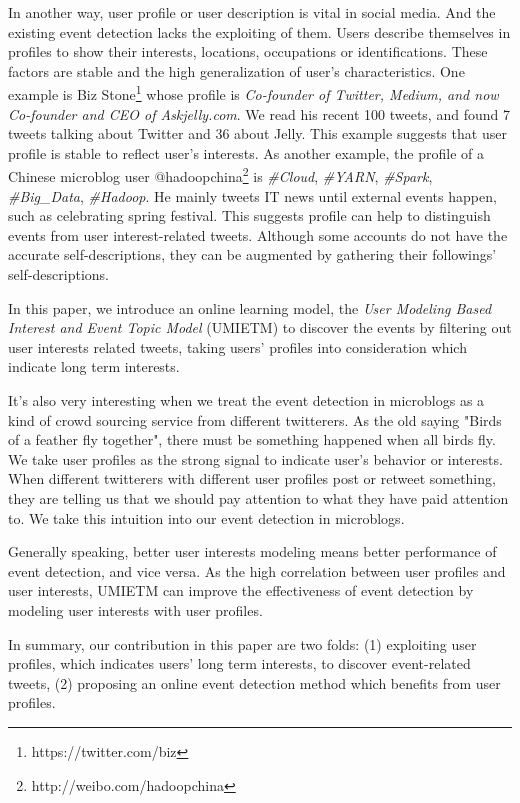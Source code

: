 \documentclass[runningheads,a4paper]{llncs}
\begin{document}
In another way, user profile or user description is vital in social media. 
And the existing event detection lacks the exploiting of them.
Users describe themselves in profiles to show their interests, locations, occupations or identifications.
These factors are stable and the high generalization of user's characteristics.
One example is Biz Stone\footnote{https://twitter.com/biz} whose profile is \textit{Co-founder of Twitter, Medium, and now Co-founder and CEO of Askjelly.com}. We read his recent 100 tweets, and found 7 tweets talking about Twitter and 36 about Jelly.
This example suggests that user profile is stable to reflect user's interests.
As another example, the profile of a Chinese microblog user @hadoopchina\footnote{http://weibo.com/hadoopchina} is \textit{\#Cloud}, \textit{\#YARN}, \textit{\#Spark}, \textit{\#Big\_Data}, \textit{\#Hadoop}. He mainly tweets IT news until external events happen,  such as celebrating spring festival.
This suggests profile can help to distinguish events from user interest-related tweets.
Although some accounts do not have the accurate self-descriptions, they can be augmented by gathering their followings' self-descriptions.

In this paper, we introduce an online learning model, the \textit{User Modeling Based Interest and Event Topic Model} (UMIETM) to discover the events by filtering out user interests related tweets, taking users' profiles into consideration which indicate long term interests.

It's also very interesting when we treat the event detection in microblogs as a kind of crowd sourcing service from different twitterers.
As the old saying "Birds of a feather fly together", there must be something happened when all birds fly. 
We take user profiles as the strong signal to indicate user's behavior or interests.
When different twitterers with different user profiles post or retweet something, they are telling us that we should pay attention to what they have paid attention to.
We take this intuition into our event detection in microblogs.

Generally speaking, better user interests modeling means better performance of event detection, and vice versa.
As the high correlation between user profiles and user interests, UMIETM can improve the effectiveness of event detection by modeling user interests with user profiles.
 
In summary, our contribution in this paper are two folds:
(1) exploiting user profiles, which indicates users' long term interests, to discover event-related tweets,
(2) proposing an online event detection method which benefits from user profiles.
\end{document}
